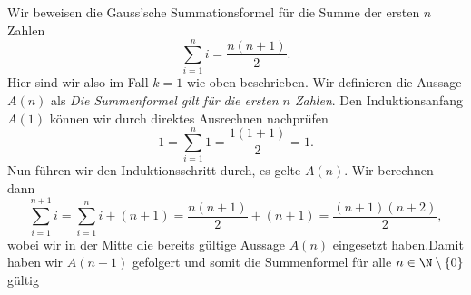 \documentclass[letterpaper,10pt,english]{jupyterBook}
\begin{document}
\begin{example}{}{}



Wir beweisen die Gauss’sche Summationsformel für die Summe der ersten \(n\) Zahlen
\begin{equation*}
  \sum_{i=1}^n i = \frac{n(n+1)}2.
\end{equation*}
Hier sind wir also im Fall \(k=1\) wie oben beschrieben. Wir definieren die Aussage \(A(n)\) als \emph{Die Summenformel gilt für die ersten \(n\) Zahlen}.
Den Induktionsanfang \(A(1)\) können wir durch direktes Ausrechnen nachprüfen
\begin{equation*}
  1 = \sum_{i=1}^n 1 = \frac{1(1+1)}2 = 1.
\end{equation*}
Nun führen wir den Induktionsschritt durch, es gelte \(A(n)\). Wir berechnen dann
\begin{equation*}
 \sum_{i=1}^{n+1} i = \sum_{i=1}^n i  + (n+1) = \frac{n(n+1)}2 + (n+1) = \frac{(n+1)(n+2)}2,
\end{equation*}
wobei wir in der Mitte die bereits gültige Aussage \(A(n)\)  eingesetzt haben.Damit haben wir \(A(n+1)\) gefolgert und somit die Summenformel für alle \(n \in \N \setminus \{0\}\) gültig
\end{example}
\end{document}
